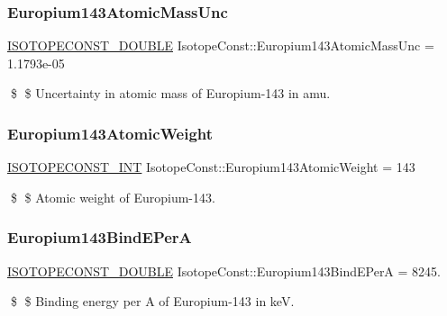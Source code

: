 \subsubsection{\texorpdfstring{Europium143\+Atomic\+Mass\+Unc}{Europium143AtomicMassUnc}}
{\footnotesize\ttfamily \mbox{\hyperlink{group___isotope_const-_macros_ga8f45a7272ce02c0b4c65c44636ed719a}{I\+S\+O\+T\+O\+P\+E\+C\+O\+N\+S\+T\+\_\+\+D\+O\+U\+B\+LE}} Isotope\+Const\+::\+Europium143\+Atomic\+Mass\+Unc = 1.\+1793e-\/05}

\$ \$ Uncertainty in atomic mass of Europium-\/143 in amu. \mbox{\label{group___isotope_const-_europium-_eu143_ga9f39b284bc58676d0132b04039691598}} 
\subsubsection{\texorpdfstring{Europium143\+Atomic\+Weight}{Europium143AtomicWeight}}
{\footnotesize\ttfamily \mbox{\hyperlink{group___isotope_const-_macros_ga5f18360b3e99483a35c32d789e62621c}{I\+S\+O\+T\+O\+P\+E\+C\+O\+N\+S\+T\+\_\+\+I\+NT}} Isotope\+Const\+::\+Europium143\+Atomic\+Weight = 143}

\$ \$ Atomic weight of Europium-\/143. \mbox{\label{group___isotope_const-_europium-_eu143_ga92afec1dcffec5d55e23768f39b42a36}} 
\subsubsection{\texorpdfstring{Europium143\+Bind\+E\+PerA}{Europium143BindEPerA}}
{\footnotesize\ttfamily \mbox{\hyperlink{group___isotope_const-_macros_ga8f45a7272ce02c0b4c65c44636ed719a}{I\+S\+O\+T\+O\+P\+E\+C\+O\+N\+S\+T\+\_\+\+D\+O\+U\+B\+LE}} Isotope\+Const\+::\+Europium143\+Bind\+E\+PerA = 8245.}

\$ \$ Binding energy per A of Europium-\/143 in keV. \mbox{\label{group___isotope_const-_europium-_eu143_gaa8b8f836b8d76b3ef28919b546bf68d3}} 
